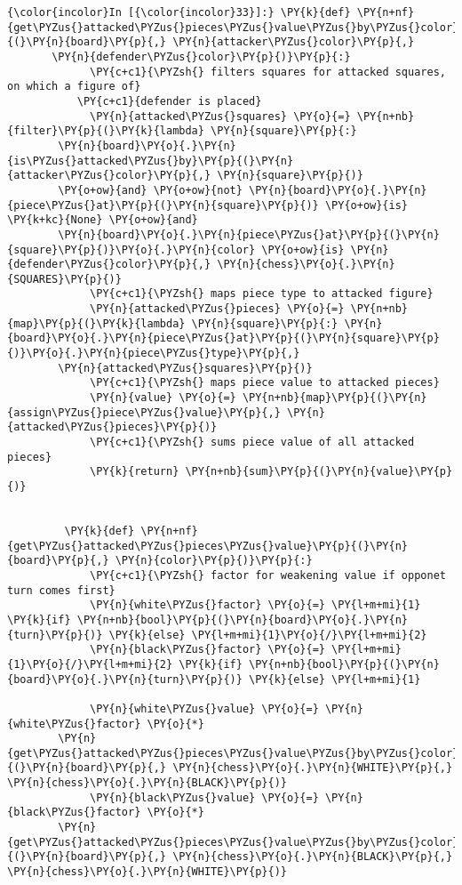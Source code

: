     \begin{Verbatim}[commandchars=\\\{\}]
{\color{incolor}In [{\color{incolor}33}]:} \PY{k}{def} \PY{n+nf}{get\PYZus{}attacked\PYZus{}pieces\PYZus{}value\PYZus{}by\PYZus{}color}\PY{p}{(}\PY{n}{board}\PY{p}{,} \PY{n}{attacker\PYZus{}color}\PY{p}{,} 
	   \PY{n}{defender\PYZus{}color}\PY{p}{)}\PY{p}{:}
             \PY{c+c1}{\PYZsh{} filters squares for attacked squares, on which a figure of}
	       \PY{c+c1}{defender is placed}
             \PY{n}{attacked\PYZus{}squares} \PY{o}{=} \PY{n+nb}{filter}\PY{p}{(}\PY{k}{lambda} \PY{n}{square}\PY{p}{:} 
		\PY{n}{board}\PY{o}{.}\PY{n}{is\PYZus{}attacked\PYZus{}by}\PY{p}{(}\PY{n}{attacker\PYZus{}color}\PY{p}{,} \PY{n}{square}\PY{p}{)} 
		\PY{o+ow}{and} \PY{o+ow}{not} \PY{n}{board}\PY{o}{.}\PY{n}{piece\PYZus{}at}\PY{p}{(}\PY{n}{square}\PY{p}{)} \PY{o+ow}{is} \PY{k+kc}{None} \PY{o+ow}{and} 
		\PY{n}{board}\PY{o}{.}\PY{n}{piece\PYZus{}at}\PY{p}{(}\PY{n}{square}\PY{p}{)}\PY{o}{.}\PY{n}{color} \PY{o+ow}{is} \PY{n}{defender\PYZus{}color}\PY{p}{,} \PY{n}{chess}\PY{o}{.}\PY{n}{SQUARES}\PY{p}{)}
             \PY{c+c1}{\PYZsh{} maps piece type to attacked figure}
             \PY{n}{attacked\PYZus{}pieces} \PY{o}{=} \PY{n+nb}{map}\PY{p}{(}\PY{k}{lambda} \PY{n}{square}\PY{p}{:} \PY{n}{board}\PY{o}{.}\PY{n}{piece\PYZus{}at}\PY{p}{(}\PY{n}{square}\PY{p}{)}\PY{o}{.}\PY{n}{piece\PYZus{}type}\PY{p}{,} 
		\PY{n}{attacked\PYZus{}squares}\PY{p}{)}
             \PY{c+c1}{\PYZsh{} maps piece value to attacked pieces}
             \PY{n}{value} \PY{o}{=} \PY{n+nb}{map}\PY{p}{(}\PY{n}{assign\PYZus{}piece\PYZus{}value}\PY{p}{,} \PY{n}{attacked\PYZus{}pieces}\PY{p}{)}
             \PY{c+c1}{\PYZsh{} sums piece value of all attacked pieces}
             \PY{k}{return} \PY{n+nb}{sum}\PY{p}{(}\PY{n}{value}\PY{p}{)}
         
         
         \PY{k}{def} \PY{n+nf}{get\PYZus{}attacked\PYZus{}pieces\PYZus{}value}\PY{p}{(}\PY{n}{board}\PY{p}{,} \PY{n}{color}\PY{p}{)}\PY{p}{:}
             \PY{c+c1}{\PYZsh{} factor for weakening value if opponet turn comes first}
             \PY{n}{white\PYZus{}factor} \PY{o}{=} \PY{l+m+mi}{1} \PY{k}{if} \PY{n+nb}{bool}\PY{p}{(}\PY{n}{board}\PY{o}{.}\PY{n}{turn}\PY{p}{)} \PY{k}{else} \PY{l+m+mi}{1}\PY{o}{/}\PY{l+m+mi}{2}
             \PY{n}{black\PYZus{}factor} \PY{o}{=} \PY{l+m+mi}{1}\PY{o}{/}\PY{l+m+mi}{2} \PY{k}{if} \PY{n+nb}{bool}\PY{p}{(}\PY{n}{board}\PY{o}{.}\PY{n}{turn}\PY{p}{)} \PY{k}{else} \PY{l+m+mi}{1}
             
             \PY{n}{white\PYZus{}value} \PY{o}{=} \PY{n}{white\PYZus{}factor} \PY{o}{*} 
		\PY{n}{get\PYZus{}attacked\PYZus{}pieces\PYZus{}value\PYZus{}by\PYZus{}color}\PY{p}{(}\PY{n}{board}\PY{p}{,} \PY{n}{chess}\PY{o}{.}\PY{n}{WHITE}\PY{p}{,} \PY{n}{chess}\PY{o}{.}\PY{n}{BLACK}\PY{p}{)}
             \PY{n}{black\PYZus{}value} \PY{o}{=} \PY{n}{black\PYZus{}factor} \PY{o}{*} 
		\PY{n}{get\PYZus{}attacked\PYZus{}pieces\PYZus{}value\PYZus{}by\PYZus{}color}\PY{p}{(}\PY{n}{board}\PY{p}{,} \PY{n}{chess}\PY{o}{.}\PY{n}{BLACK}\PY{p}{,} \PY{n}{chess}\PY{o}{.}\PY{n}{WHITE}\PY{p}{)}
         

\end{Verbatim}
